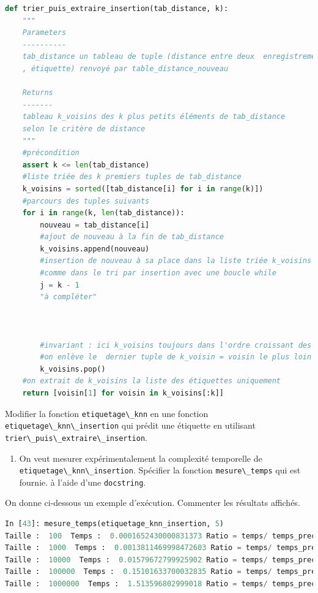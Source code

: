 \documentclass[
  11pt,
]{article}
\newcommand{\passthrough}[1]{#1}
\providecommand{\tightlist}{%
  \setlength{\itemsep}{0pt}\setlength{\parskip}{0pt}}
\newcounter{def}
\newcounter{cours}
\begin{document}
\begin{lstlisting}[language=Python]
def trier_puis_extraire_insertion(tab_distance, k):
    """
    Parameters
    ----------
    tab_distance un tableau de tuple (distance entre deux  enregistrements
    , étiquette) renvoyé par table_distance_nouveau
    
    Returns
    -------
    tableau k_voisins des k plus petits éléments de tab_distance
    selon le critère de distance
    """
    #précondition
    assert k <= len(tab_distance)
    #liste triée des k premiers tuples de tab_distance 
    k_voisins = sorted([tab_distance[i] for i in range(k)])
    #parcours des tuples suivants
    for i in range(k, len(tab_distance)):     
        nouveau = tab_distance[i]
        #ajout de nouveau à la fin de tab_distance
        k_voisins.append(nouveau)
        #insertion de nouveau à sa place dans la liste triée k_voisins
        #comme dans le tri par insertion avec une boucle while
        j = k - 1
        "à compléter"
        
        
        
        #invariant : ici k_voisins toujours dans l'ordre croissant des distances
        #on enlève le  dernier tuple de k_voisin = voisin le plus loin
        k_voisins.pop()
    #on extrait de k_voisins la liste des étiquettes uniquement
    return [voisin[1] for voisin in k_voisins[:k]]
\end{lstlisting}

Modifier la fonction \passthrough{\lstinline!etiquetage\_knn!} en une
fonction \passthrough{\lstinline!etiquetage\_knn\_insertion!} qui prédit
une étiquette en utilisant
\passthrough{\lstinline!trier\_puis\_extraire\_insertion!}.

\begin{enumerate}
\def\labelenumi{\arabic{enumi}.}
\setcounter{enumi}{5}
\tightlist
\item
  On veut mesurer expérimentalement la complexité temporelle de
  \passthrough{\lstinline!etiquetage\_knn\_insertion!}. Spécifier la
  fonction \passthrough{\lstinline!mesure\_temps!} qui est fournie. à
  l'aide d'une \passthrough{\lstinline!docstring!}.
\end{enumerate}

On donne ci-dessous un exemple d'exécution. Commenter les résultats
affichés.

\begin{lstlisting}[language=Python]
In [43]: mesure_temps(etiquetage_knn_insertion, 5)
Taille :  100  Temps :  0.0001652430000831373 Ratio = temps/ temps_precedent = None
Taille :  1000  Temps :  0.0013811469998472603 Ratio = temps/ temps_precedent = 8.358278409084654
Taille :  10000  Temps :  0.01579672799925902 Ratio = temps/ temps_precedent = 11.437398047424324
Taille :  100000  Temps :  0.15101633700032835 Ratio = temps/ temps_precedent = 9.559975775199275
Taille :  1000000  Temps :  1.513596802999018 Ratio = temps/ temps_precedent = 10.022735507057936
\end{lstlisting}
\end{document}
